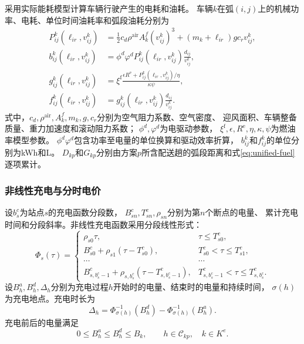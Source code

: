 采用实际能耗模型计算车辆行驶产生的电耗和油耗\cite{ref:23}。
车辆$k$在弧$(i,j)$上的机械功率、电耗、单位时间油耗率和弧段油耗分别为
\begin{align}
P_{ij}^{k}(\ell_{ir},v_{ij}^{k})
&=\frac{1}{2}c_d\rho^{\mathrm{air}}A_k^{f}(v_{ij}^{k})^3
+(m_k+\ell_{ir})gc_rv_{ij}^{k},
\label{eq:unified-power}\\
b_{ij}^{k}(\ell_{ir},v_{ij}^{k})
&=\phi^{d}\varphi^{d}P_{ij}^{k}(\ell_{ir},v_{ij}^{k})
\frac{d_{ij}}{v_{ij}^{k}},
\label{eq:unified-electricity}\\
g_{ij}^{k}(\ell_{ir},v_{ij}^{k})
&=\xi^{\mathrm f}\frac{\epsilon R^{\mathrm e}
+P_{ij}^{k}(\ell_{ir},v_{ij}^{k})/\eta}{\kappa\psi},
\label{eq:unified-fuel-rate}\\
f_{ij}^{k}(\ell_{ir},v_{ij}^{k})
&=g_{ij}^{k}(\ell_{ir},v_{ij}^{k})\frac{d_{ij}}{v_{ij}^{k}}.
\label{eq:unified-fuel}
\end{align}
式中，$c_d,\rho^{\mathrm{air}},A_k^{f},m_k,g,c_r$分别为空气阻力系数、空气密度、
迎风面积、车辆整备质量、重力加速度和滚动阻力系数；
$\phi^{d},\varphi^{d}$为电驱动参数，
$\xi^{\mathrm f},\epsilon,R^{\mathrm e},\eta,\kappa,\psi$为燃油率模型参数。
$\phi^{d}\varphi^{d}$包含功率至电量的单位换算和驱动效率折算，
$b_{ij}^{k}$和$f_{ij}^{k}$的单位分别为kWh和L。
$D_{kp}$和$G_{kp}$分别由方案$p$所含配送趟的弧段距离和式\eqref{eq:unified-fuel}逐项累计。

\subsubsection{非线性充电与分时电价}

设$b_s^{c}$为站点$s$的充电函数分段数，
$B_{sn}^{c},T_{sn}^{c},\rho_{sn}$分别为第$n$个断点的电量、
累计充电时间和分段斜率。非线性充电函数采用分段线性形式\cite{ref:94}：
\begin{equation}
\Phi_s(\tau)=
\begin{cases}
\rho_{s0}\tau, & \tau\le T_{s0}^{c},\\
B_{s0}^{c}+\rho_{s1}(\tau-T_{s0}^{c}),
& T_{s0}^{c}<\tau\le T_{s1}^{c},\\
\cdots & \cdots\\
B_{s,b_s^{c}-1}^{c}+\rho_{s,b_s^{c}}(\tau-T_{s,b_s^{c}-1}^{c}),
& T_{s,b_s^{c}-1}^{c}<\tau\le T_{s,b_s^{c}}^{c}.
\end{cases}
\label{eq:unified-charge-function}
\end{equation}
设$B_h^{a},B_h^{d},\Delta_h$分别为充电过程$h$开始时的电量、结束时的电量和持续时间，
$\sigma(h)$为充电地点。充电时长为\cite{ref:montoya}
\begin{equation}
\Delta_h=
\Phi_{\sigma(h)}^{-1}(B_h^{d})-
\Phi_{\sigma(h)}^{-1}(B_h^{a}).
\label{eq:unified-charge-duration}
\end{equation}
充电前后的电量满足
\begin{equation}
0\le B_h^{a}\le B_h^{d}\le B_k,
\qquad h\in\mathcal C_{kp},\quad k\in K^{e}.
\label{eq:unified-charge-energy-bound}
\end{equation}


